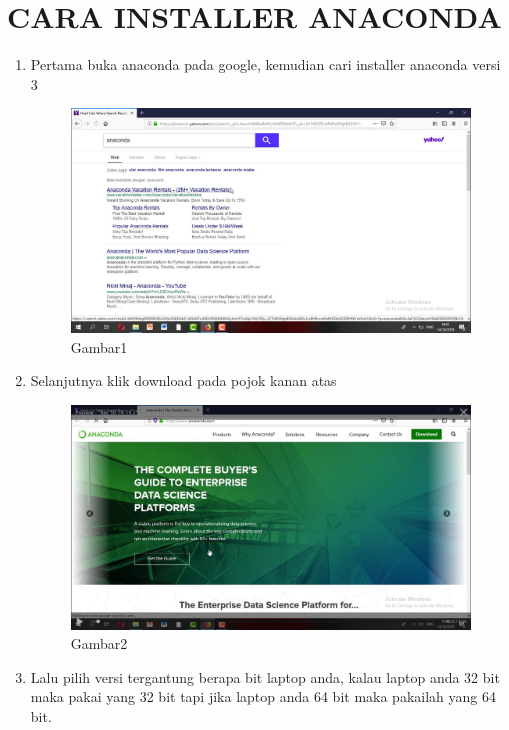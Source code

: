 \section{CARA INSTALLER ANACONDA}
\begin{enumerate}
\item 	Pertama buka anaconda pada google, kemudian cari installer anaconda versi 3
\begin{figure}[h]
    \centering
    \includegraphics[scale=0.2]{gambar/cara1.png}
    \caption{Gambar1}
    \label{fig:my_label}
\end{figure}
\item Selanjutnya klik download pada pojok kanan atas
\begin{figure}[h]
    \centering
    \includegraphics[scale=0.2]{gambar/cara2.png}
    \caption{Gambar2}
    \label{fig:my_label}
\end{figure}
\item Lalu pilih versi tergantung berapa bit laptop anda, kalau laptop anda 32 bit maka pakai yang 32 bit tapi jika laptop anda 64 bit maka pakailah yang 64 bit.
\begin{figure}[h]

\end{figure}
\end{enumerate}
